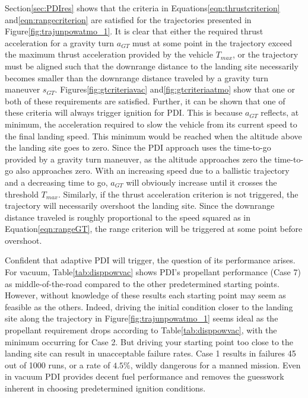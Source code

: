 Section\:\ref{sec:PDIres} shows that the criteria in Equations\:\ref{eqn:thrustcriterion} and\:\ref{eqn:rangecriterion} are satisfied for the trajectories presented in Figure\:\ref{fig:trajunpowatmo_1}. It is clear that either the required thrust acceleration for a gravity turn $a_{GT}$ must at some point in the trajectory exceed the maximum thrust acceleration provided by the vehicle $T_{max}$, or the trajectory must be aligned such that the downrange distance to the landing site necessarily becomes smaller than the downrange distance traveled by a gravity turn maneuver $s_{GT}$. Figures\:\ref{fig:gtcriteriavac} and\:\ref{fig:gtcriteriaatmo} show that one or both of these requirements are satisfied. Further, it can be shown that one of these criteria will always trigger ignition for PDI. This is because $a_{GT}$ reflects, at minimum, the acceleration required to slow the vehicle from its current speed to the final landing speed. This minimum would be reached when the altitude above the landing site goes to zero. Since the PDI approach uses the time-to-go provided by a gravity turn maneuver, as the altitude approaches zero the time-to-go also approaches zero. With an increasing speed due to a ballistic trajectory and a decreasing time to go, $a_{GT}$ will obviously increase until it crosses the threshold $T_{max}$. Similarly, if the thrust acceleration criterion is not triggered, the trajectory will necessarily overshoot the landing site. Since the downrange distance traveled is roughly proportional to the speed squared as in Equation\:\ref{eqn:rangeGT}, the range criterion will be triggered at some point before overshoot.

Confident that adaptive PDI will trigger, the question of its performance arises. For vacuum, Table\:\ref{tab:disppowvac} shows PDI's propellant performance (Case 7) as middle-of-the-road compared to the other predetermined starting points. However, without knowledge of these results each starting point may seem as feasible as the others. Indeed, driving the initial condition closer to the landing site along the trajectory in Figure\:\ref{fig:trajunpowatmo_1} seems ideal as the propellant requirement drops according to Table\:\ref{tab:disppowvac}, with the minimum occurring for Case 2. But driving your starting point too close to the landing site can result in unacceptable failure rates. Case 1 results in failures 45 out of 1000 runs, or a rate of $4.5\%$, wildly dangerous for a manned mission. Even in vacuum PDI provides decent fuel performance and removes the guesswork inherent in choosing predetermined ignition conditions.

